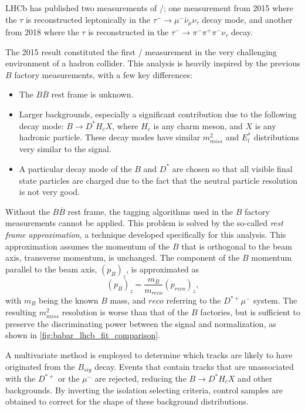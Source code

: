 LHCb has published two measurements of \RDST/; one measurement from 2015 where
the $\tau$ is reconstructed leptonically in the
$\tau^- \rightarrow \mu^- \bar{\nu}_\mu \nu_\tau$ decay mode,
and another from 2018 where the $\tau$ is reconstructed in the
$\tau^- \rightarrow \pi^- \pi^+ \pi^- \nu_\tau$ decay.

The 2015 result constituted the first \RDst/ measurement in the very challenging
environment of a hadron collider.
This analysis is heavily inspired by the previous $B$ factory measurements, with
a few key differences:

\begin{itemize}
    \item The $B \overline{B}$ rest frame is unknown.
    \item Larger backgrounds, especially a significant contribution due to the
        following decay mode: $B \rightarrow D^* H_c X$, where $H_c$ is any
        charm meson, and $X$ is any hadronic particle.
        These decay modes have similar $m^2_{miss}$ and $E^{*}_l$ distributions
        very similar to the signal.
    \item A particular decay mode of the $B$ and $D^{*}$ are chosen so that all
        visible final state particles are charged due to the fact that the
        neutral particle resolution is not very good.
\end{itemize}

Without the $B \overline{B}$ rest frame, the tagging algorithms used in the $B$
factory measurements cannot be applied.
This problem is solved by the so-called \emph{rest frame approximation}, a
technique developed specifically for this analysis.
This approximation assumes the momentum of the $B$ that is orthogonal to the
beam axis, transverse momentum, is unchanged.
The component of the $B$ momentum parallel to the beam axis, $(p_{B})_z$, is
approximated as
\begin{equation}
    (p_{B})_z = \frac{m_B}{m_{reco}} (p_{reco})_z,
\end{equation}
with $m_B$ being the known $B$ mass, and $reco$ referring to the $D^{*+} \mu^-$
system.
The resulting $m^2_{miss}$ resolution is worse than that of the $B$ factories,
but is sufficient to preserve the discriminating power between the signal and
normalization, as shown in \autoref{fig:babar_lhcb_fit_comparison}.

A multivariate method is employed to determine which tracks are likely to have
originated from the $B_{sig}$ decay.
Events that contain tracks that are unassociated with the $D^{*+}$ or the
$\mu^-$ are rejected, reducing the $B \rightarrow D^* H_c X$ and other
backgrounds.
By inverting the isolation selecting criteria, control samples are obtained to
correct for the shape of these background distributions.

